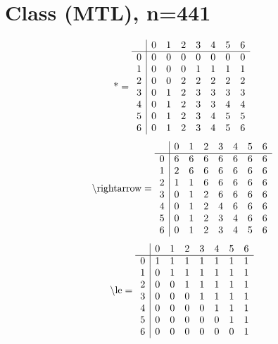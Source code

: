 \documentclass[11pt]{article}
\begin{document}
\section{Class (MTL), n=441}
\[\text{*} = 
\begin{array}{r | r r r r r r r}
 & 0 & 1 & 2 & 3 & 4 & 5 & 6 \\ \hline
0 & 0 & 0 & 0 & 0 & 0 & 0 & 0 \\
1 & 0 & 0 & 0 & 1 & 1 & 1 & 1 \\
2 & 0 & 0 & 2 & 2 & 2 & 2 & 2 \\
3 & 0 & 1 & 2 & 3 & 3 & 3 & 3 \\
4 & 0 & 1 & 2 & 3 & 3 & 4 & 4 \\
5 & 0 & 1 & 2 & 3 & 4 & 5 & 5 \\
6 & 0 & 1 & 2 & 3 & 4 & 5 & 6 \\
\end{array}
\]
\[\text{\textbackslash rightarrow} = 
\begin{array}{r | r r r r r r r}
 & 0 & 1 & 2 & 3 & 4 & 5 & 6 \\ \hline
0 & 6 & 6 & 6 & 6 & 6 & 6 & 6 \\
1 & 2 & 6 & 6 & 6 & 6 & 6 & 6 \\
2 & 1 & 1 & 6 & 6 & 6 & 6 & 6 \\
3 & 0 & 1 & 2 & 6 & 6 & 6 & 6 \\
4 & 0 & 1 & 2 & 4 & 6 & 6 & 6 \\
5 & 0 & 1 & 2 & 3 & 4 & 6 & 6 \\
6 & 0 & 1 & 2 & 3 & 4 & 5 & 6 \\
\end{array}
\]
\[\text{\textbackslash le} = 
\begin{array}{r | r r r r r r r}
 & 0 & 1 & 2 & 3 & 4 & 5 & 6 \\ \hline
0 & 1 & 1 & 1 & 1 & 1 & 1 & 1 \\
1 & 0 & 1 & 1 & 1 & 1 & 1 & 1 \\
2 & 0 & 0 & 1 & 1 & 1 & 1 & 1 \\
3 & 0 & 0 & 0 & 1 & 1 & 1 & 1 \\
4 & 0 & 0 & 0 & 0 & 1 & 1 & 1 \\
5 & 0 & 0 & 0 & 0 & 0 & 1 & 1 \\
6 & 0 & 0 & 0 & 0 & 0 & 0 & 1 \\
\end{array}
\]
\end{document}
